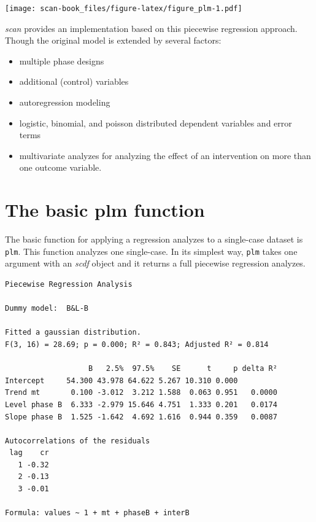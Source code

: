 \documentclass[
]{book}
\newenvironment{Shaded}{\begin{snugshade}}{\end{snugshade}}
\newcommand{\FunctionTok}[1]{\textcolor[rgb]{0.00,0.00,0.00}{#1}}
\newcommand{\NormalTok}[1]{#1}
\newcommand{\SpecialCharTok}[1]{\textcolor[rgb]{0.00,0.00,0.00}{#1}}
\providecommand{\tightlist}{%
  \setlength{\itemsep}{0pt}\setlength{\parskip}{0pt}}
\begin{document}
\texttt{[image: scan-book\_files/figure-latex/figure\_plm-1.pdf]}

\emph{scan} provides an implementation based on this piecewise regression approach. Though the original model is extended by several factors:

\begin{itemize}
\tightlist
\item
  multiple phase designs
\item
  additional (control) variables
\item
  autoregression modeling
\item
  logistic, binomial, and poisson distributed dependent variables and error terms
\item
  multivariate analyzes for analyzing the effect of an intervention on more than one outcome variable.
\end{itemize}

\hypertarget{the-basic-plm-function}{%
\section{The basic plm function}\label{the-basic-plm-function}}

The basic function for applying a regression analyzes to a single-case dataset is \texttt{plm}. This function analyzes one single-case. In its simplest way, \texttt{plm} takes one argument with an \emph{scdf} object and it returns a full piecewise regression analyzes.

\begin{Shaded}
\end{Shaded}

\begin{verbatim}
Piecewise Regression Analysis

Dummy model:  B&L-B 

Fitted a gaussian distribution.
F(3, 16) = 28.69; p = 0.000; R² = 0.843; Adjusted R² = 0.814

                   B   2.5%  97.5%    SE      t     p delta R²
Intercept     54.300 43.978 64.622 5.267 10.310 0.000         
Trend mt       0.100 -3.012  3.212 1.588  0.063 0.951   0.0000
Level phase B  6.333 -2.979 15.646 4.751  1.333 0.201   0.0174
Slope phase B  1.525 -1.642  4.692 1.616  0.944 0.359   0.0087

Autocorrelations of the residuals
 lag    cr
   1 -0.32
   2 -0.13
   3 -0.01

Formula: values ~ 1 + mt + phaseB + interB
\end{verbatim}
\end{document}
